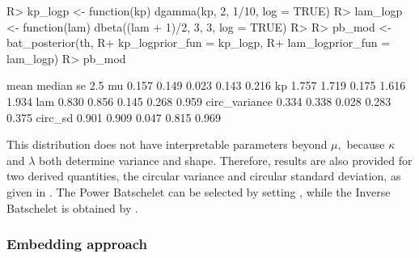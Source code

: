 \begin{CodeChunk}

\begin{CodeInput}
R> kp_logp  <- function(kp) dgamma(kp, 2, 1/10, log = TRUE)
R> lam_logp <- function(lam) dbeta((lam + 1)/2, 3, 3, log = TRUE)
R> 
R> pb_mod <- bat_posterior(th, 
R+                         kp_logprior_fun  = kp_logp,
R+                         lam_logprior_fun = lam_logp)
R> pb_mod
\end{CodeInput}

\begin{CodeOutput}
               mean median    se  2.5%
mu            0.157  0.149 0.023 0.143 0.216
kp            1.757  1.719 0.175 1.616 1.934
lam           0.830  0.856 0.145 0.268 0.959
circ_variance 0.334  0.338 0.028 0.283 0.375
circ_sd       0.901  0.909 0.047 0.815 0.969
\end{CodeOutput}
\end{CodeChunk}

This distribution does not have interpretable parameters beyond \(\mu,\)
because \(\kappa\) and \(\lambda\) both determine variance and shape.
Therefore, results are also provided for two derived quantities, the
circular variance and circular standard deviation, as given in
\citep{fisher1995statistical}. The Power Batschelet can be selected by
setting , while the Inverse Batschelet is
obtained by .

\hypertarget{embedding-approach}{%
\subsubsection{Embedding approach}\label{embedding-approach}}

\label{sec:embed}

